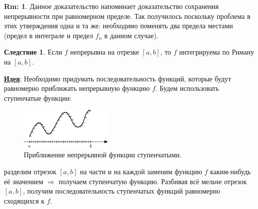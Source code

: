 \documentclass[12pt]{article}
\theoremstyle{definition}
\newtheorem{rem}{Rm:}
\newtheorem{corollary}{Следствие}
\begin{document}
\begin{rem}
	Данное доказательство напоминает доказательство сохранения непрерывности при равномерном пределе. Так получилось поскольку проблема в этих утверждения одна и та же: необходимо поменять два предела местами (предел в интеграле и предел $f_n$ в данном случае).
\end{rem}

\begin{corollary}
	Если $f$ непрерывна на отрезке $[a,b]$, то $f$ интегрируема по Риману на $[a,b]$.
\end{corollary}
\textbf{\uline{Идея}}: Необходимо придумать последовательность функций, которые будут равномерно приближать непрерывную функцию $f$. Будем использовать ступенчатые функции:
\begin{figure}[H]
	\centering
	\includegraphics[width=0.4\textwidth]{22_1.eps}
	\caption{Приближение непрерывной функции ступенчатыми.}
	\label{22_1}
\end{figure}
разделим отрезок $[a,b]$ на части и на каждой заменим функцию $f$ каким-нибудь её значением $\Rightarrow$ получаем ступенчатую функцию. Разбивая всё мельче отрезок $[a,b]$, получим последовательность ступенчатых функций равномерно сходящихся к $f$.
\end{document}
